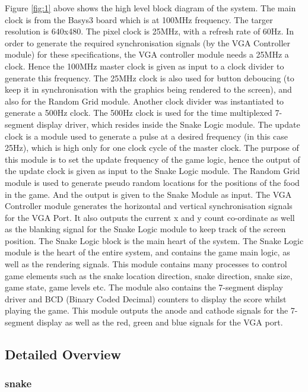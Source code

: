 \documentclass[aps, secnumarabic, balancelastpage, asmath, amssymb, nofootinbib, floatfix,]{revtex4-2}
\begin{document}
{Figure \ref{fig:1} above shows the high level block diagram of the system. The main clock is from the Basys3 board which is at 100MHz frequency. The targer resolution is 640x480. The pixel clock is 25MHz, with a refresh rate of 60Hz. In order to generate the required synchronisation signals (by the VGA Controller module) for these specifications, the VGA controller module needs a 25MHz a clock. Hence the 100MHz master clock is given as input to a clock divider to generate this frequency. The 25MHz clock is also used for button deboucing (to keep it in synchronisation with the graphics being rendered to the screen), and also for the Random Grid module. Another clock divider was instantiated to generate a 500Hz clock. The 500Hz clock is used for the time multiplexed 7-segment display driver, which resides inside the Snake Logic module. The update clock is a module used to generate a pulse at a desired frequency (in this case 25Hz), which is high only for one clock cycle of the master clock. The purpose of this module is to set the update frequency of the game logic, hence the output of the update clock is given as input to the Snake Logic module. The Random Grid module is used to generate pseudo random locations for the positions of the food in the game. And the output is given to the Snake Module as input. The VGA Controller module generates the horizontal and vertical synchronisation signals for the VGA Port. It also outputs the current x and y count co-ordinate as well as the blanking signal for the Snake Logic module to keep track of the screen position. The Snake Logic block is the main heart of the system. The Snake Logic module is the heart of the entire system, and contains the game main logic, as well as the rendering signals. This module contains many processes to control game elements such as the snake location direction, snake direction, snake size, game state, game levels etc. The module also contains the 7-segment display driver and BCD (Binary Coded Decimal) counters to display the score whilst playing the game. This module outputs the anode and cathode signals for the 7-segment display as well as the red, green and blue signals for the VGA port. 

\vspace{-1.0em}
\subsection{\fontsize{11.4pt}{12pt}\selectfont \bf Detailed Overview \label{sec:2.2}}

\subsubsection{\fontsize{10pt}{12pt}\selectfont \bf snake \label{sec:2.2.1}}

}
\end{document}
